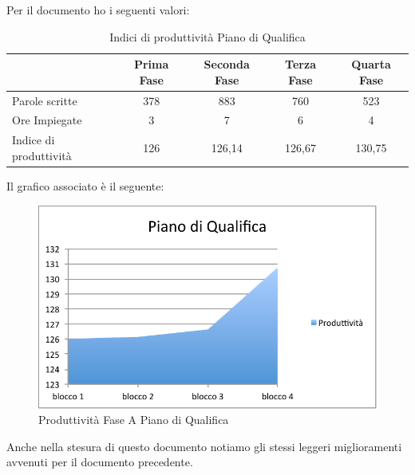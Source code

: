 						Per il documento  ho i seguenti valori:	
						\begin{table}[H]\centering
							\begin{tabu}{| l | c | c | c | c |}
								\hline
													&Prima Fase 	& Seconda Fase	& Terza Fase	& Quarta Fase  \\ \hline
												
								Parole scritte				& 378		& 883 		& 760			& 523 	 \\ \hline
								Ore Impiegate				& 3			& 7 			& 6				& 4	 	 \\ \hline\hline
								
								Indice di produttività 			 & 126		& 126,14 		& 126,67			& 130,75 	 \\ \hline
							\end{tabu}
							\caption{Indici di produttività Piano di Qualifica}
						\end{table}
						Il grafico associato è il seguente:
						\begin{figure}[H]\centering
							\includegraphics[width=12cm]{PianoDiQualifica/Pics/ProduttivitaPdQFaseA.pdf}
							\caption{Produttività Fase A Piano di Qualifica}
						\end{figure}
						Anche nella stesura di questo documento notiamo gli stessi leggeri miglioramenti avvenuti per il documento precedente.\\
						
